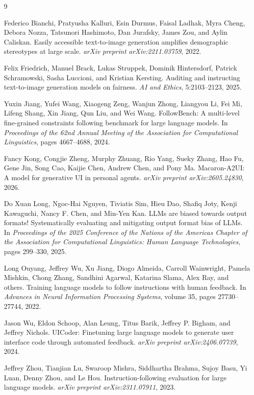\documentclass[10pt]{article}
\begin{document}
\begin{thebibliography}{9}

Federico Bianchi, Pratyusha Kalluri, Esin Durmus, Faisal Ladhak, Myra Cheng, Debora Nozza, Tatsunori Hashimoto, Dan Jurafsky, James Zou, and Aylin Caliskan.
\newblock Easily accessible text-to-image generation amplifies demographic stereotypes at large scale.
\newblock \emph{arXiv preprint arXiv:2211.03759}, 2022.

Felix Friedrich, Manuel Brack, Lukas Struppek, Dominik Hintersdorf, Patrick Schramowski, Sasha Luccioni, and Kristian Kersting.
\newblock Auditing and instructing text-to-image generation models on fairness.
\newblock \emph{AI and Ethics}, 5:2103--2123, 2025.

Yuxin Jiang, Yufei Wang, Xiaogeng Zeng, Wanjun Zhong, Liangyou Li, Fei Mi, Lifeng Shang, Xin Jiang, Qun Liu, and Wei Wang.
\newblock FollowBench: A multi-level fine-grained constraints following benchmark for large language models.
\newblock In \emph{Proceedings of the 62nd Annual Meeting of the Association for Computational Linguistics}, pages 4667--4688, 2024.

Fancy Kong, Congjie Zheng, Murphy Zhuang, Rio Yang, Sueky Zhang, Hao Fu, Gene Jin, Song Cao, Kaijie Chen, Andrew Chen, and Pony Ma.
\newblock Macaron-A2UI: A model for generative UI in personal agents.
\newblock \emph{arXiv preprint arXiv:2605.24830}, 2026.

Do Xuan Long, Ngoc-Hai Nguyen, Tiviatis Sim, Hieu Dao, Shafiq Joty, Kenji Kawaguchi, Nancy F. Chen, and Min-Yen Kan.
\newblock LLMs are biased towards output formats! Systematically evaluating and mitigating output format bias of LLMs.
\newblock In \emph{Proceedings of the 2025 Conference of the Nations of the Americas Chapter of the Association for Computational Linguistics: Human Language Technologies}, pages 299--330, 2025.

Long Ouyang, Jeffrey Wu, Xu Jiang, Diogo Almeida, Carroll Wainwright, Pamela Mishkin, Chong Zhang, Sandhini Agarwal, Katarina Slama, Alex Ray, and others.
\newblock Training language models to follow instructions with human feedback.
\newblock In \emph{Advances in Neural Information Processing Systems}, volume 35, pages 27730--27744, 2022.

Jason Wu, Eldon Schoop, Alan Leung, Titus Barik, Jeffrey P. Bigham, and Jeffrey Nichols.
\newblock UICoder: Finetuning large language models to generate user interface code through automated feedback.
\newblock \emph{arXiv preprint arXiv:2406.07739}, 2024.

Jeffrey Zhou, Tianjian Lu, Swaroop Mishra, Siddhartha Brahma, Sujoy Basu, Yi Luan, Denny Zhou, and Le Hou.
\newblock Instruction-following evaluation for large language models.
\newblock \emph{arXiv preprint arXiv:2311.07911}, 2023.

\end{thebibliography}
\end{document}
